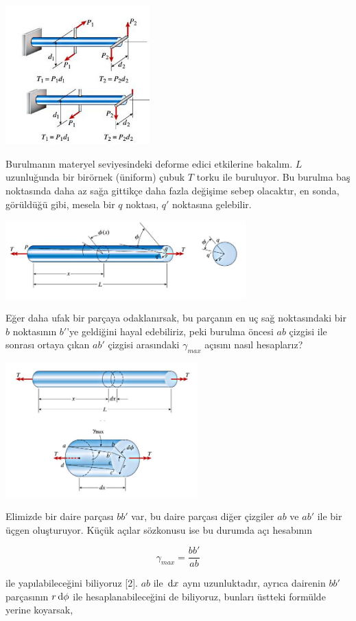 \documentclass[12pt,fleqn]{article}\usepackage{../../common}
\begin{document}
\includegraphics[width=15em]{phy_020_strs_06_02.jpg}

Burulmanın materyel seviyesindeki deforme edici etkilerine bakalım. $L$
uzunluğunda bir birörnek (üniform) çubuk $T$ torku ile buruluyor. Bu
burulma baş noktasında daha az sağa gittikçe daha fazla değişime
sebep olacaktır, en sonda, görüldüğü gibi, mesela bir $q$ noktası, $q'$
noktasına gelebilir. 

\includegraphics[width=25em]{phy_020_strs_06_03.jpg}

Eğer daha ufak bir parçaya odaklanırsak, bu parçanın en uç sağ noktasındaki
bir $b$ noktasının $b'$'ye geldiğini hayal edebiliriz, peki burulma öncesi $ab$
çizgisi ile sonrası ortaya çıkan $ab'$ çizgisi arasındaki  $\gamma_{max}$
açısını nasıl hesaplarız? 

\includegraphics[width=20em]{phy_020_strs_06_04.jpg}

Elimizde bir daire parçası $bb'$ var, bu daire parçası diğer çizgiler $ab$
ve $ab'$ ile bir üçgen oluşturuyor. Küçük açılar sözkonusu ise bu durumda
açı hesabının

$$
\gamma_{max} = \frac{bb'}{ab}
$$

ile yapılabileceğini biliyoruz [2]. $ab$ ile $\,\mathrm{d} x$ aynı uzunluktadır,
ayrıca dairenin $bb'$ parçasının $r \,\mathrm{d} \phi$ ile hesaplanabileceğini de
biliyoruz, bunları üstteki formülde yerine koyarsak,
\end{document}
